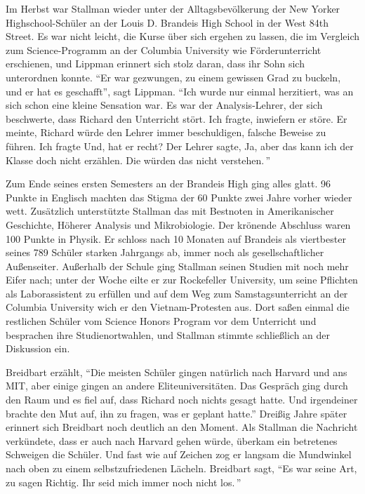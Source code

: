 Im Herbst war Stallman wieder unter der Alltagsbevölkerung der New Yorker Highschool-Schüler an der Louis D. Brandeis High School in der West 84th Street. Es war nicht leicht, die Kurse über sich ergehen zu lassen, die im Vergleich zum Science-Programm an der Columbia University wie Förderunterricht erschienen, und Lippman erinnert sich stolz daran, dass ihr Sohn sich unterordnen konnte.
"`Er war gezwungen, zu einem gewissen Grad zu buckeln, und er hat es geschafft"', sagt Lippman. "`Ich wurde nur einmal herzitiert, was an sich schon eine kleine Sensation war. Es war der Analysis-Lehrer, der sich beschwerte, dass Richard den Unterricht stört. Ich fragte, inwiefern er störe. Er meinte, Richard würde den Lehrer immer beschuldigen, falsche Beweise zu führen. Ich fragte \glq Und, hat er recht?{}\grq{} Der Lehrer sagte, \glq Ja, aber das kann ich der Klasse doch nicht erzählen. Die würden das nicht verstehen.\grq\,"'

Zum Ende seines ersten Semesters an der Brandeis High ging alles glatt. 96 Punkte in Englisch machten das Stigma der 60 Punkte zwei Jahre vorher wieder wett. Zusätzlich unterstützte Stallman das mit Bestnoten in Amerikanischer Geschichte, Höherer Analysis und Mikrobiologie. Der krönende Abschluss waren 100 Punkte in Physik.
Er schloss nach 10 Monaten auf Brandeis als viertbester seines 789 Schüler starken Jahrgangs ab, immer noch als gesellschaftlicher Außenseiter. Außerhalb der Schule ging Stallman seinen Studien mit noch mehr Eifer nach; unter der Woche eilte er zur Rockefeller University, um seine Pflichten als Laborassistent zu erfüllen und auf dem Weg zum Samstagsunterricht an der Columbia University wich er den Vietnam-Protesten aus. Dort saßen einmal die restlichen Schüler vom Science Honors Program vor dem Unterricht und besprachen ihre Studienortwahlen, und Stallman stimmte schließlich an der Diskussion ein.

Breidbart erzählt, "`Die meisten Schüler gingen natürlich nach Harvard und ans MIT, aber einige gingen an andere Eliteuniversitäten. Das Gespräch ging durch den Raum und es fiel auf, dass Richard noch nichts gesagt hatte. Und irgendeiner brachte den Mut auf, ihn zu fragen, was er geplant hatte."'
Dreißig Jahre später erinnert sich Breidbart noch deutlich an den Moment. Als Stallman die Nachricht verkündete, dass er auch nach Harvard gehen würde, überkam ein betretenes Schweigen die Schüler. Und fast wie auf Zeichen zog er langsam die Mundwinkel nach oben zu einem selbstzufriedenen Lächeln. Breidbart sagt, "`Es war seine Art, zu sagen \glq Richtig. Ihr seid mich immer noch nicht los.\grq\,"'